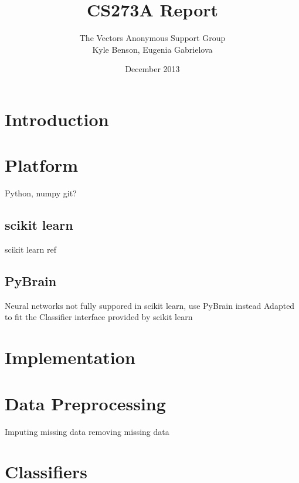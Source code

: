 \documentclass{article}
\title{CS273A Report}
\author{The Vectors Anonymous Support Group\\Kyle Benson, Eugenia Gabrielova}
\date{December 2013}
\begin{document}
\maketitle

\section{Introduction}


\section{Platform}

Python, numpy
git?

\subsection{scikit learn}

scikit learn ref \cite{pedregosa2011scikit}

\subsection{PyBrain}

Neural networks not fully suppored in scikit learn, use PyBrain instead \cite{schaul2010}
Adapted to fit the Classifier interface provided by scikit learn


\section{Implementation}


\section{Data Preprocessing}

Imputing missing data
removing missing data


\section{Classifiers}
\end{document}
